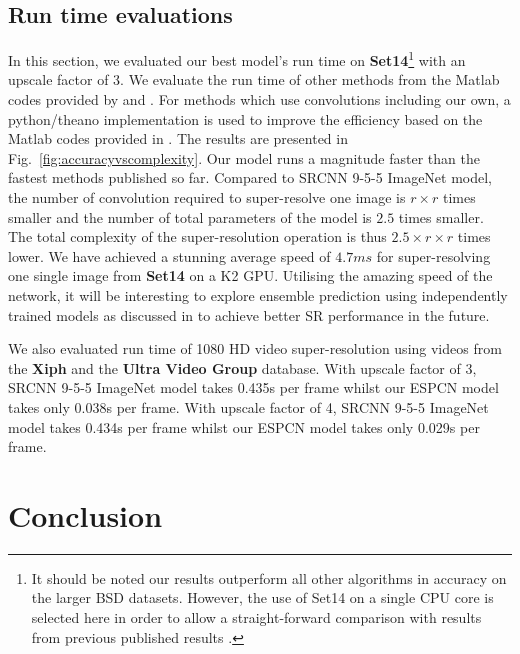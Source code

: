 \documentclass[10pt,twocolumn,letterpaper]{article}
\begin{document}
\subsection{Run time evaluations}
\label{subsection:runtime}

In this section, we evaluated our best model's run time on \textbf{Set14}\footnote{It should be noted our results outperform all other algorithms in accuracy on the larger BSD datasets. However, the use of Set14 on a single CPU core is selected here in order to allow a straight-forward comparison with results from previous published results \cite{schulter2015fast,dong2014learning}.} with an upscale factor of 3. We evaluate the run time of other methods \cite{chang2004super,zeyde2012single,timofte2013anchored} from the Matlab codes provided by \cite{timofte2014a+} and \cite{schulter2015fast}. For methods which use convolutions including our own, a python/theano implementation is used to improve the efficiency based on the Matlab codes provided in \cite{dong2015image,chen2015trainable}. The results are presented in Fig.~\ref{fig:accuracyvscomplexity}. Our model runs a magnitude faster than the fastest methods published so far. Compared to SRCNN 9-5-5 ImageNet model, the number of convolution required to super-resolve one image is $r \times r$ times smaller and the number of total parameters of the model is $2.5$ times smaller. The total complexity of the super-resolution operation is thus $2.5 \times r \times r$ times lower. We have achieved a stunning average speed of $4.7ms$ for super-resolving one single image from \textbf{Set14} on a K2 GPU. Utilising the amazing speed of the network, it will be interesting to explore ensemble prediction using independently trained models as discussed in \cite{Szegedy43022} to achieve better \ac{SR} performance in the future.

We also evaluated run time of 1080 \ac{HD} video super-resolution using videos from the \textbf{Xiph} and the \textbf{Ultra Video Group} database. With upscale factor of 3, SRCNN 9-5-5 ImageNet model takes 0.435s per frame whilst our \ac{ESPCN} model takes only 0.038s per frame. With upscale factor of 4, SRCNN 9-5-5 ImageNet model takes 0.434s per frame whilst our \ac{ESPCN} model takes only 0.029s per frame.
%
\section{Conclusion}
\label{sec:conclusion}
%
\end{document}
